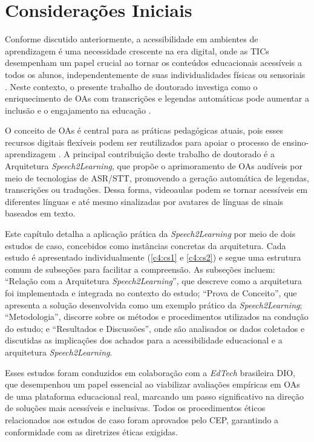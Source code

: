 \section{Considerações Iniciais}

Conforme discutido anteriormente, a acessibilidade em ambientes de aprendizagem é uma necessidade crescente na era digital, onde as TICs desempenham um papel crucial ao tornar os conteúdos educacionais acessíveis a todos os alunos, independentemente de suas individualidades físicas ou sensoriais \cite{Mayer2021}. Neste contexto, o presente trabalho de doutorado investiga como o enriquecimento de OAs com transcrições e legendas automáticas pode aumentar a inclusão e o engajamento na educação \cite{FalvoJr2023_HICSS, FalvoJr2024_FIE}.

O conceito de OAs é central para as práticas pedagógicas atuais, pois esses recursos digitais flexíveis podem ser reutilizados para apoiar o processo de ensino-aprendizagem \cite{Parakh2022}. A principal contribuição deste trabalho de doutorado é a Arquitetura \textit{Speech2Learning}, que propõe o aprimoramento de OAs audíveis por meio de tecnologias de ASR/STT, promovendo a geração automática de legendas, transcrições ou traduções. Dessa forma, videoaulas podem se tornar acessíveis em diferentes línguas e até mesmo sinalizadas por avatares de línguas de sinais baseados em texto.

Este capítulo detalha a aplicação prática da \textit{Speech2Learning} por meio de dois estudos de caso, concebidos como instâncias concretas da arquitetura. Cada estudo é apresentado individualmente (\autoref{c4:cs1} e \autoref{c4:cs2}) e segue uma estrutura comum de subseções para facilitar a compreensão. As subseções incluem: ``Relação com a Arquitetura \textit{Speech2Learning}'', que descreve como a arquitetura foi implementada e integrada no contexto do estudo; ``Prova de Conceito'', que apresenta a solução desenvolvida como um exemplo prático da \textit{Speech2Learning}; ``Metodologia'', discorre sobre os métodos e procedimentos utilizados na condução do estudo; e ``Resultados e Discussões'', onde são analisados os dados coletados e discutidas as implicações dos achados para a acessibilidade educacional e a arquitetura \textit{Speech2Learning}.

Esses estudos foram conduzidos em colaboração com a \textit{EdTech} brasileira DIO, que desempenhou um papel essencial ao viabilizar avaliações empíricas em OAs de uma plataforma educacional real, marcando um passo significativo na direção de soluções mais acessíveis e inclusivas. Todos os procedimentos éticos relacionados aos estudos de caso foram aprovados pelo CEP, garantindo a conformidade com as diretrizes éticas exigidas.

